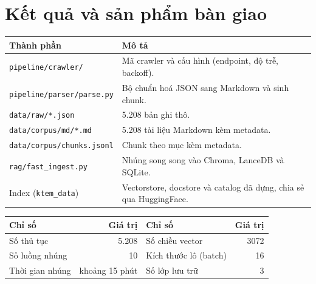\documentclass[11pt]{article}
\begin{document}

\section{Kết quả và sản phẩm bàn giao}
\begin{table}[H]
\centering\small
\begin{tabular}{@{}lp{8.7cm}@{}}
\toprule
Thành phần & Mô tả \\
\midrule
\texttt{pipeline/crawler/} & Mã crawler và cấu hình (endpoint, độ trễ, backoff). \\
\texttt{pipeline/parser/parse.py} & Bộ chuẩn hoá JSON sang Markdown và sinh chunk. \\
\texttt{data/raw/*.json} & 5.208 bản ghi thô. \\
\texttt{data/corpus/md/*.md} & 5.208 tài liệu Markdown kèm metadata. \\
\texttt{data/corpus/chunks.jsonl} & Chunk theo mục kèm metadata. \\
\texttt{rag/fast\_ingest.py} & Nhúng song song vào Chroma, LanceDB và SQLite. \\
Index (\texttt{ktem\_data}) & Vectorstore, docstore và catalog đã dựng, chia sẻ qua HuggingFace. \\
\bottomrule
\end{tabular}
\end{table}

\begin{table}[H]
\centering\small
\begin{tabular}{@{}lr@{\hspace{1.1cm}}lr@{}}
\toprule
Chỉ số & Giá trị & Chỉ số & Giá trị \\
\midrule
Số thủ tục      & 5.208 & Số chiều vector & 3072 \\
Số luồng nhúng  & 10    & Kích thước lô (batch) & 16 \\
Thời gian nhúng & khoảng 15 phút & Số lớp lưu trữ & 3 \\
\bottomrule
\end{tabular}
\end{table}
\end{document}
